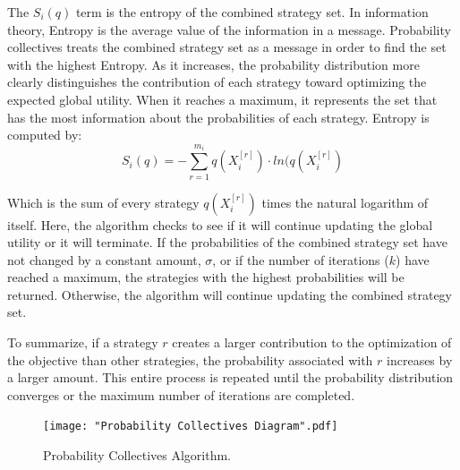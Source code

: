 \documentclass{sig-alternate}
\begin{document}
{The $S_i(q)$ term is the entropy of the combined strategy set. In information theory, Entropy is the average value of the information in a message. Probability collectives treats the combined strategy set as a message in order to find the set with the highest Entropy. As it increases, the probability distribution more clearly distinguishes the contribution of each strategy toward optimizing the expected global utility. When it reaches a maximum, it represents the set that has the most information about the probabilities of each strategy. Entropy is computed by:
	\begin{equation}
	S_i(q)=-\sum_{r=1}^{m_i}q(X_i^{[r]})\cdot ln(q(X_i^{[r]})
	\end{equation}
	
Which is the sum of every strategy $q(X_i^{[r]})$ times the natural logarithm of itself. Here, the algorithm checks to see if it will continue updating the global utility or it will terminate. If the probabilities of the combined strategy set have not changed by a constant amount, $\sigma$, or if the number of iterations ($k$) have reached a maximum, the strategies with the highest probabilities will be returned. Otherwise, the algorithm will continue updating the combined strategy set.

To summarize, if a strategy $r$ creates a larger contribution to the optimization of the objective than other strategies, the probability associated with $r$ increases by a larger amount. This entire process is repeated until the probability distribution converges or the maximum number of iterations are completed. 

\begin{figure}
\centering
\texttt{[image: "Probability Collectives Diagram".pdf]}
\caption{Probability Collectives Algorithm.}
\label{fig:PCDiagram}
\end{figure}


}
\end{document}
